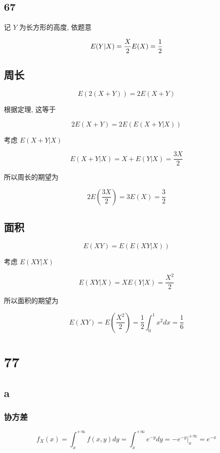\documentclass[]{article}
\date{}
\begin{document}
\subsection{67}\label{header-n36}

记 \(Y\) 为长方形的高度, 依题意

\[E(Y | X)=\frac{X}{2}\\

E(X)=\frac{1}{2}\]

\subsection{周长}\label{header-n40}

\[E(2(X+Y))=2E(X+Y)\]

根据定理, 这等于

\[2E(X+Y)=2E(E(X+Y|X))\]

考虑 \(E(X+Y|X)\)

\[E(X+Y|X)=X+E(Y|X)=\frac{3X}{2}\]

所以周长的期望为

\[2E(\frac{3X}{2})=3E(X)=\frac{3}{2}\]

\subsection{面积}\label{header-n48}

\[E(XY)=E(E(XY|X))\]

考虑 \(E(XY|X)\)

\[E(XY|X)=XE(Y|X)=\frac{X^2}{2}\]

所以面积的期望为

\[E(XY)=E(\frac{X^2}{2})=\frac{1}{2}\int_0^1x^2dx=\frac{1}{6}\]

\section{77}\label{header-n54}

\subsection{a}\label{header-n55}

\subsubsection{协方差}\label{header-n67}

\[f_{X}(x)=\int_{x}^{+\infty} f(x, y) d y=\int_{x}^{+\infty} e^{-y} d y=-\left.e^{-y}\right|_{x} ^{+\infty}=e^{-x}\]
\end{document}

